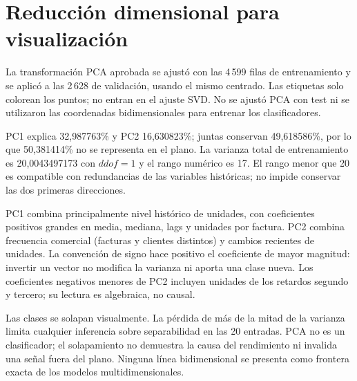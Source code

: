 \barrerapagina
\section{Reducción dimensional para visualización}
La transformación PCA aprobada se ajustó con las 4\,599 filas de entrenamiento y se aplicó a las 2\,628 de validación, usando el mismo centrado. Las etiquetas solo colorean los puntos; no entran en el ajuste SVD. No se ajustó PCA con test ni se utilizaron las coordenadas bidimensionales para entrenar los clasificadores.

PC1 explica 32,987763\% y PC2 16,630823\%; juntas conservan 49,618586\%, por lo que 50,381414\% no se representa en el plano. La varianza total de entrenamiento es 20,0043497173 con $ddof=1$ y el rango numérico es 17. El rango menor que 20 es compatible con redundancias de las variables históricas; no impide conservar las dos primeras direcciones.


PC1 combina principalmente nivel histórico de unidades, con coeficientes positivos grandes en media, mediana, lags y unidades por factura. PC2 combina frecuencia comercial (facturas y clientes distintos) y cambios recientes de unidades. La convención de signo hace positivo el coeficiente de mayor magnitud: invertir un vector no modifica la varianza ni aporta una clase nueva. Los coeficientes negativos menores de PC2 incluyen unidades de los retardos segundo y tercero; su lectura es algebraica, no causal.

Las clases se solapan visualmente. La pérdida de más de la mitad de la varianza limita cualquier inferencia sobre separabilidad en las 20 entradas. PCA no es un clasificador; el solapamiento no demuestra la causa del rendimiento ni invalida una señal fuera del plano. Ninguna línea bidimensional se presenta como frontera exacta de los modelos multidimensionales.
